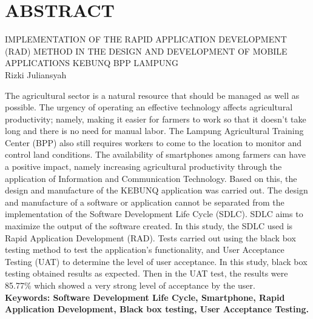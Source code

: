 

\chapter*{ABSTRACT}
\noindent IMPLEMENTATION OF THE RAPID APPLICATION DEVELOPMENT (RAD) METHOD IN THE DESIGN AND DEVELOPMENT OF MOBILE APPLICATIONS KEBUNQ BPP LAMPUNG\\
Rizki Juliansyah

\begin{singlespace}

\begin{justify}
    The agricultural sector is a natural resource that should be managed as well as 
    possible. The urgency of operating an effective technology affects agricultural 
    productivity; namely, making it easier for farmers to work so that it doesn't take 
    long and there is no need for manual labor. The Lampung Agricultural Training Center 
    (BPP) also still requires workers to come to the location to monitor and control land 
    conditions. The availability of smartphones among farmers can have a positive impact, 
    namely increasing agricultural productivity through the application of Information and 
    Communication Technology. Based on this, the design and manufacture of the KEBUNQ 
    application was carried out. The design and manufacture of a software or application 
    cannot be separated from the implementation of the Software Development Life Cycle 
    (SDLC). SDLC aims to maximize the output of the software created. In this study, the 
    SDLC used is Rapid Application Development (RAD). Tests carried out using the black 
    box testing method to test the application's functionality, and User Acceptance 
    Testing (UAT) to determine the level of user acceptance. In this study, black box 
    testing obtained results as expected. Then in the UAT test, the results were 85.77\% 
    which showed a very strong level of acceptance by the user.\\[2cm]
    \textbf{Keywords: Software Development Life Cycle, Smartphone, Rapid Application Development, Black box testing, User Acceptance Testing.}

\end{justify}

    
\end{singlespace}

\newpage